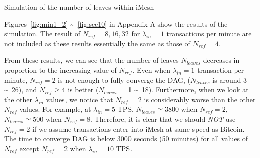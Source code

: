 \documentclass[a4paper,10pt,twocolumn]{article}
\begin{document}
	\begin{algorithm}[ht]                  
		\caption{Simulation of the number of leaves within iMesh}         
		\label{alg:sim1}
		\begin{algorithmic}
			\STATE{}
	
		\STATE{}
	
	\STATE{}
	\ENDFOR{}
	\ENDIF{}
	\ENDFOR{}
	\ENDWHILE{}
	\end{algorithmic}
		\end{algorithm}

	Figures~\ref{fig:min1_2} \textasciitilde~\ref{fig:sec10} in Appendix A show the results of the simulation.
	 The result of \( N_{ref}=8,16,32\) for \( \lambda_{in}=1\) transactions per minute are not included
	 as these results essentially the same as those of \( N_{ref}=4\).

	 From these results, we can see that the number of leaves \( N_{leaves}\) decreases in proportion to the increasing value of \( N_{ref} \).
	 Even when \( \lambda_{in}=1\) transaction per minute, \( N_{ref}=2\) is not enough to fully converge the DAG, (\( N_{leaves}\) is around 3 \textasciitilde~26),
	 and \( N_{ref} \ge 4\)  is better (\( N_{leaves}\) = 1 \textasciitilde~18).
	 Furthermore, when we look at the other \( \lambda_{in}\) values, we notice that \( N_{ref}=2\) is considerably worse than the other \( N_{ref}\) values.
	 For example, at \( \lambda_{in}=5\) TPS,  \( N_{leaves} \simeq 3800 \) when \( N_{ref}=2\),
	\( N_{leaves} \simeq 500\)  when \( N_{ref}=8\). Therefore, it is clear that we should \emph{NOT} use \( N_{ref}=2\) if we assume 
	transactions enter into iMesh at same speed as Bitcoin.
	The time to converge DAG is below 3000 seconds (50 minutes) for all values of \( N_{ref} \) except \( N_{ref}=2\) when \( \lambda_{in}=10\) TPS\@.
	
\end{document}
